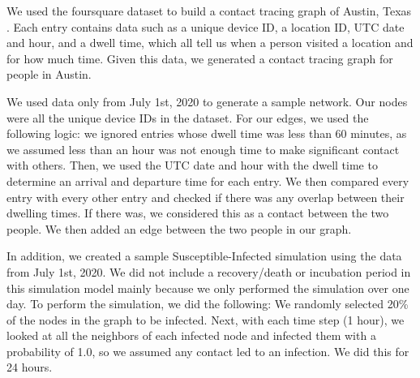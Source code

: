 \documentclass[times, 10pt,twocolumn]{article}
\begin{document}














We used the foursquare dataset to build a contact tracing graph of Austin, Texas \cite{DVN/PFLAH4_2020}. Each entry contains data such as a unique device ID, a location ID, UTC date and hour, and a dwell time, which all tell us when a person visited a location and for how much time. Given this data, we generated a contact tracing graph for people in Austin.

We used data only from July 1st, 2020 to generate a sample network. Our nodes were all the unique device IDs in the dataset. For our edges, we used the following logic: we ignored entries whose dwell time was less than 60 minutes, as we assumed less than an hour was not enough time to make significant contact with others. Then, we used the UTC date and hour with the dwell time to determine an arrival and departure time for each entry. We then compared every entry with every other entry and checked if there was any overlap between their dwelling times. If there was, we considered this as a contact between the two people. We then added an edge between the two people in our graph.

In addition, we created a sample Susceptible-Infected simulation using the data from July 1st, 2020. We did not include a recovery/death or incubation period in this simulation model mainly because we only performed the simulation over one day. To perform the simulation, we did the following: We randomly selected 20\% of the nodes in the graph to be infected. Next, with each time step (1 hour), we looked at all the neighbors of each infected node and infected them with a probability of 1.0, so we assumed any contact led to an infection. We did this for 24 hours.
\end{document}
